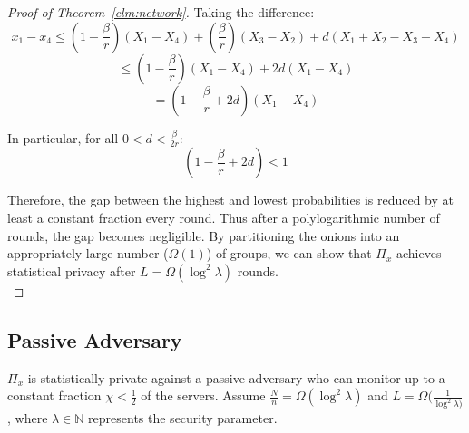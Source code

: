 \begin{proof} [Proof of Theorem~\ref{clm:network}]
    Taking the difference:
    $$
    x_1 - x_4 \leq \left( 1 - \frac{\beta}{r} \right) ( X_1 - X_4) + \left(\frac{\beta}{r} \right) (X_3 - X_2) + d ( X_1 + X_2 - X_3 - X_4 )
    $$
    $$
    \leq \left( 1 - \frac{\beta}{r} \right) ( X_1 - X_4) + 2d ( X_1 - X_4 )
    $$
    $$
    = \left( 1 - \frac{\beta}{r} + 2d \right) ( X_1 - X_4)
    $$

    In particular, for all $0 < d <\frac{\beta}{2r}$:
    $$
    \left( 1 - \frac{\beta}{r} + 2d \right) < 1
    $$

    Therefore, the gap between the highest and lowest probabilities is reduced by at least a constant fraction every round. Thus after a polylogarithmic number of rounds, the gap becomes negligible. By partitioning the onions into an appropriately large number ($\Omega(1)$) of groups, we can show that $\Pi_x$ achieves statistical privacy after $L = \Omega(\log^2 \lambda)$ rounds. \\

\end{proof}

\subsection{Passive Adversary}

\begin{theorem} \label{clm:passive}
    $\Pi_x$ is statistically private against a passive adversary who can monitor up to a constant fraction $\chi < \frac{1}{2}$ of the servers. Assume $\frac{N}{n} = \Omega(\log^2 \lambda)$ and $L = \Omega(\frac{1}{\log^2 \lambda)}$, where $\lambda \in \mathbb{N}$ represents the security parameter.\\
\end{theorem}

